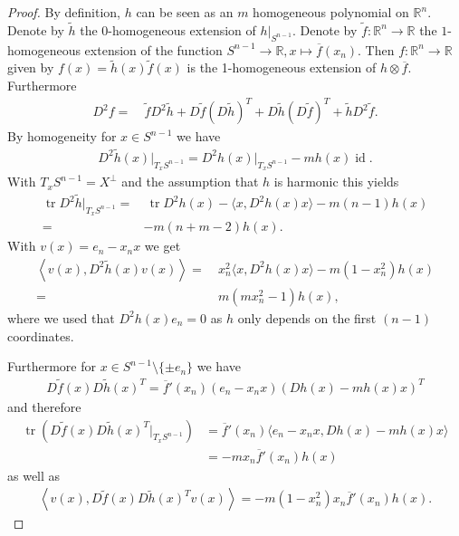 \documentclass[12pt,twoside]{amsart}
\numberwithin{satz}{section}
\theoremstyle{definition}
\numberwithin{equation}{section}
\newcommand\R{\mathbb{R}}
\newcommand\id{\operatorname{id}}
\newcommand\tr{\operatorname{tr}}
\begin{document}
	\begin{proof}
		By definition, $h$ can be seen as an $m$ homogeneous polynomial on $\R^n$. Denote by $\tilde{h}$ the $0$-homogeneous extension of $h|_{S^{n-1}}$. Denote by $\tilde{f}:\R^n\to\R$ the $1$-homogeneous extension of the function $S^{n-1}\to\R,x\mapsto \overline{f}(x_n)$. Then $f:\R^n\to\R$ given by $f(x)=\tilde{h}(x)\tilde{f}(x)$ is the 1-homogeneous extension of $h\otimes \overline{f}$. Furthermore
		\begin{align*}
			D^2f=& \ \tilde{f}D^2\tilde{h}+ D\tilde{f}(D\tilde{h})^T+D\tilde{h}(D\tilde{f})^T+\tilde{h}D^2\tilde{f}.
		\end{align*}
		By homogeneity for $x\in S^{n-1}$ we have 
		\begin{align*}
			D^2\tilde{h}(x)\big|_{T_xS^{n-1}}=D^2h(x)|_{T_xS^{n-1}}-mh(x)\id.
		\end{align*}
		With $T_xS^{n-1}=X^\perp$ and the assumption that $h$ is harmonic this yields 
		\begin{align}\label{eq_1}
			\tr D^2\tilde{h}\big|_{T_xS^{n-1}}=& \ \tr D^2h(x) -\langle x,D^2h(x)x\rangle - m(n-1)h(x) \nonumber \\
			=& -m(n+m-2)h(x).
		\end{align}
		With $v(x)=e_n-x_nx$ we get
		\begin{align}\label{eq_2}
			\left\langle v(x),D^2\tilde{h}(x)v(x)\right\rangle =& \ x_n^2\langle x,D^2h(x)x\rangle - m(1-x_n^2)h(x) \nonumber \\
			=& \ m(mx_n^2-1)h(x),
		\end{align}
		where we used that $D^2h(x)e_n=0$ as $h$ only depends on the first $(n-1)$ coordinates. 
		
		Furthermore for $x\in S^{n-1}\setminus\{\pm e_n\}$ we have
		\begin{align*}
			D\tilde{f}(x) D\tilde{h}(x)^T= \overline{f}'(x_n)(e_n-x_nx) (Dh(x)-mh(x)x)^T
		\end{align*}
		and therefore
		\begin{align}\label{eq_3}
			\tr \left(D\tilde{f}(x) D\tilde{h}(x)^T\big|_{T_xS^{n-1}}\right) & =\overline{f}'(x_n)\langle e_n-x_nx,Dh(x)-mh(x)x\rangle \nonumber\\
			& = -mx_n\overline{f}'(x_n)h(x)
		\end{align}
		as well as
		\begin{align}\label{eq_4}
			\left\langle v(x), D\tilde{f}(x) D\tilde{h}(x)^Tv(x)\right\rangle = -m(1-x_n^2)x_n\overline{f}'(x_n)h(x).
		\end{align}
		

\end{proof}
\end{document}

